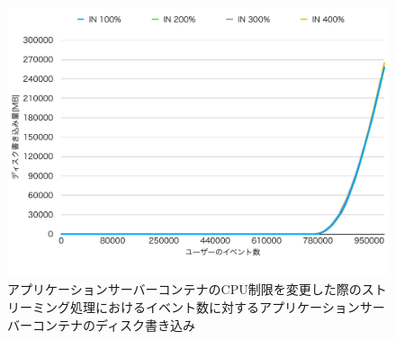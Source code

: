 \documentclass[../../../../../main]{subfiles}
\begin{document}
    \begin{figure}[H]
        \centering
        \includegraphics[width=12cm]{graph}
        \caption{アプリケーションサーバーコンテナのCPU制限を変更した際のストリーミング処理におけるイベント数に対するアプリケーションサーバーコンテナのディスク書き込み}
        \label{fig:stream-change-cpu-limit-app-disk-in-app_1024-db_1_1024}
    \end{figure}
\end{document}
